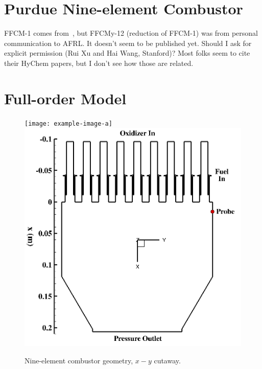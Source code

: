 \section{Purdue Nine-element Combustor}

{\color{red}FFCM-1 comes from~\cite{ffcm1}, but FFCMy-12 (reduction of FFCM-1) was from personal communication to AFRL. It doesn't seem to be published yet. Should I ask for explicit permission (Rui Xu and Hai Wang, Stanford)? Most folks seem to cite their HyChem papers, but I don't see how those are related.}

\section{Full-order Model}

\begin{figure}
    \centering
	\ifdefined\DRAFT
		\texttt{[image: example-image-a]}
	\else
    	\includegraphics[width=0.9\linewidth]{Chapters/NineElement/Images/geom_xy.png}
	\fi
    \caption{\label{fig:nineElemGeomXY}Nine-element combustor geometry, $x-y$ cutaway.}
\end{figure}

